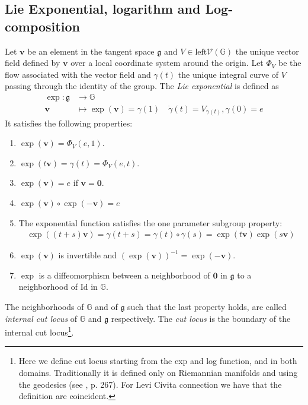 \subsection{Lie Exponential, logarithm and Log-composition}\label{se:lie_exp_log_comp}
Let $\mathbf{v}$ be an element in the tangent space $\mathfrak{g}$ and $V\in\text{left}\mathcal{V}(\mathbb{G})$ the unique vector field defined by $\mathbf{v}$ over a local coordinate system around the origin. Let $\Phi_{V}$ be the flow associated with the vector field and $\gamma(t)$ the unique integral curve of $V$ passing through the identity of the group.  
The \emph{Lie exponential} is defined as
\begin{align*}
\exp :  \mathfrak{g} & \longrightarrow  \mathbb{G}  \\
\mathbf{v} &\longmapsto  \exp(\mathbf{v} ) = \gamma(1) \quad \dot{\gamma}(t) = V_{\gamma(t)}, \gamma(0) = e
\end{align*}
It satisfies the following properties:
\begin{enumerate}
	\item $\exp(\mathbf{v}) = \Phi_{V}(e,1)$.
	\item $\exp(t\mathbf{v}) =\gamma(t) = \Phi_{V}(e,t)$.
	\item $\exp(\mathbf{v}) = e$ if $\mathbf{v} = \mathbf{0}$.
	\item $\exp(\mathbf{v})\circ \exp(\mathbf{-v})  = e$
	\item The exponential function satisfies the one parameter subgroup property:
	\begin{align*}
	\exp((t+s)\mathbf{v}) = \gamma(t+s) = \gamma(t)\circ \gamma(s) = \exp(t\mathbf{v})\exp(s\mathbf{v})
	\end{align*}
	\item $\exp(\mathbf{v})$ is invertible and $(\exp(\mathbf{v}))^{-1} = \exp(-\mathbf{v})$.
	\item $\exp$ is a diffeomorphism between a neighborhood of $\mathbf{0}$ in $\mathfrak{g}$ to a neighborhood of $\text{Id}$ in $\mathbb{G}$.
\end{enumerate}
The neighborhoods of $\mathbb{G}$ and of $\mathfrak{g}$ such that the last property holds, are called \emph{internal cut locus} of $\mathbb{G}$ and $\mathfrak{g}$ respectively. The \emph{cut locus} is the boundary of the internal cut locus\footnote{Here we define cut locus starting from the exp and log function, and in both domains. Traditionally it is defined only on Riemannian manifolds and using the geodesics (see \cite{do1992riemannian}, p. 267). For Levi Civita connection we have that the definition are coincident.}.\\
